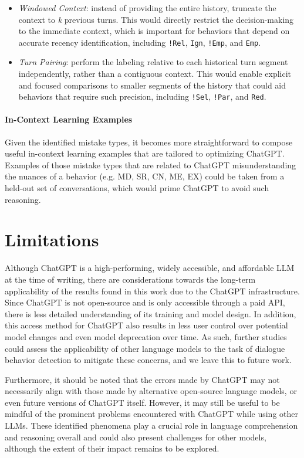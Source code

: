 \begin{itemize}
    \item \textit{Windowed Context}: instead of providing the entire history, truncate the context to \textit{k} previous turns. This would directly restrict the decision-making to the immediate context, which is important for behaviors that depend on accurate recency identification, including \texttt{!Rel}, \texttt{Ign}, \texttt{!Emp}, and \texttt{Emp}.
    \item \textit{Turn Pairing}: perform the labeling relative to each historical turn segment independently, rather than a contiguous context. This would enable explicit and focused comparisons to smaller segments of the history that could aid behaviors that require such precision, including \texttt{!Sel}, \texttt{!Par}, and \texttt{Red}.
\end{itemize}

\paragraph{In-Context Learning Examples} Given the identified mistake types, it becomes more straightforward to compose useful in-context learning examples that are tailored to optimizing ChatGPT. Examples of those mistake types that are related to ChatGPT misunderstanding the nuances of a behavior (e.g. MD, SR, CN, ME, EX) could be taken from a held-out set of conversations, which would prime ChatGPT to avoid such reasoning.

\section{Limitations}

Although ChatGPT is a high-performing, widely accessible, and affordable LLM at the time of writing, there are considerations towards the long-term applicability of the results found in this work due to the ChatGPT infrastructure. Since ChatGPT is not open-source and is only accessible through a paid API, there is less detailed understanding of its training and model design. In addition, this access method for ChatGPT also results in less user control over potential model changes and even model deprecation over time. As such, further studies could assess the applicability of other language models to the task of dialogue behavior detection to mitigate these concerns, and we leave this to future work.

Furthermore, it should be noted that the errors made by ChatGPT may not necessarily align with those made by alternative open-source language models, or even future versions of ChatGPT itself. However, it may still be useful to be mindful of the prominent problems encountered with ChatGPT while using other LLMs. These identified phenomena play a crucial role in language comprehension and reasoning overall and could also present challenges for other models, although the extent of their impact remains to be explored.


